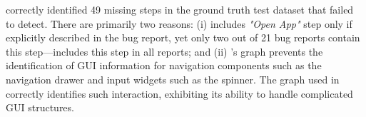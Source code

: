 \tool correctly identified 49 missing steps in the ground truth test dataset that \EulerC failed to detect. There are primarily two reasons: (i) \EulerC includes \textit{"Open App"} step only if explicitly described in the bug report, yet only two out of 21 bug reports contain this step---\tool includes this step in all  reports; and (ii) \EulerC's graph prevents the identification of GUI information for navigation components such as the navigation drawer and input widgets such as the spinner.  The graph used in \tool correctly identifies such interaction, exhibiting its ability to handle complicated GUI structures. 
